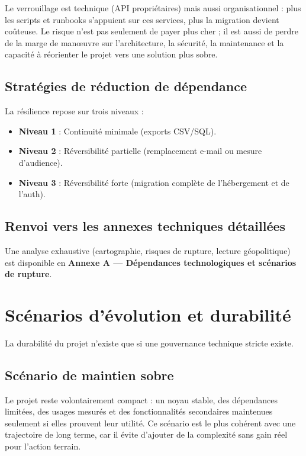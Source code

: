 \documentclass[
  10pt,
  a4paper,
  DIV=11,
  numbers=noendperiod,
  oneside]{scrreprt}
\providecommand{\tightlist}{%
  \setlength{\itemsep}{0pt}\setlength{\parskip}{0pt}}
\let\oldtextbf\textbf
\renewcommand{\textbf}[1]{\oldtextbf{\textcolor{cmmnavy}{#1}}}
\begin{document}
Le verrouillage est technique (API propriétaires) mais aussi
organisationnel : plus les scripts et runbooks s'appuient sur ces
services, plus la migration devient coûteuse. Le risque n'est pas
seulement de payer plus cher ; il est aussi de perdre de la marge de
manœuvre sur l'architecture, la sécurité, la maintenance et la capacité
à réorienter le projet vers une solution plus sobre.

\subsection{Stratégies de réduction de
dépendance}\label{stratuxe9gies-de-ruxe9duction-de-duxe9pendance}

La résilience repose sur trois niveaux :

\begin{itemize}
\tightlist
\item
  \textbf{Niveau 1} : Continuité minimale (exports CSV/SQL).
\item
  \textbf{Niveau 2} : Réversibilité partielle (remplacement e-mail ou
  mesure d'audience).
\item
  \textbf{Niveau 3} : Réversibilité forte (migration complète de
  l'hébergement et de l'auth).
\end{itemize}

\subsection{Renvoi vers les annexes techniques
détaillées}\label{renvoi-vers-les-annexes-techniques-duxe9tailluxe9es}

Une analyse exhaustive (cartographie, risques de rupture, lecture
géopolitique) est disponible en \textbf{Annexe A --- Dépendances
technologiques et scénarios de rupture}.

\section{Scénarios d'évolution et
durabilité}\label{scuxe9narios-duxe9volution-et-durabilituxe9}

La durabilité du projet n'existe que si une gouvernance technique
stricte existe.

\subsection{Scénario de maintien
sobre}\label{scuxe9nario-de-maintien-sobre}

Le projet reste volontairement compact : un noyau stable, des
dépendances limitées, des usages mesurés et des fonctionnalités
secondaires maintenues seulement si elles prouvent leur utilité. Ce
scénario est le plus cohérent avec une trajectoire de long terme, car il
évite d'ajouter de la complexité sans gain réel pour l'action terrain.
\end{document}
